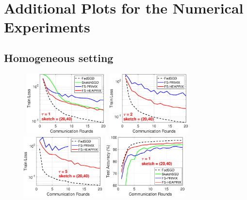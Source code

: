 \documentclass[twoside]{article}
\begin{document}
\section{Additional Plots for the Numerical Experiments}

\subsection{Homogeneous setting}
\begin{figure}[H]
	\begin{center}
		\mbox{			  
		 \includegraphics[width=1.7in]{MNIST_figures/local1_sketch20_iid1_train_loss.eps} \hspace{-0.2in}
		\includegraphics[width=1.7in]{MNIST_figures/local2_sketch20_iid1_train_loss.eps} \hspace{-0.2in}
		\includegraphics[width=1.7in]{MNIST_figures/local5_sketch20_iid1_train_loss.eps}\hspace{-0.2in}
		\includegraphics[width=1.7in]{MNIST_figures/local1_sketch20_iid1_test_acc.eps} \hspace{-0.2in}
		}
		

\end{center}
\end{figure}
\end{document}
